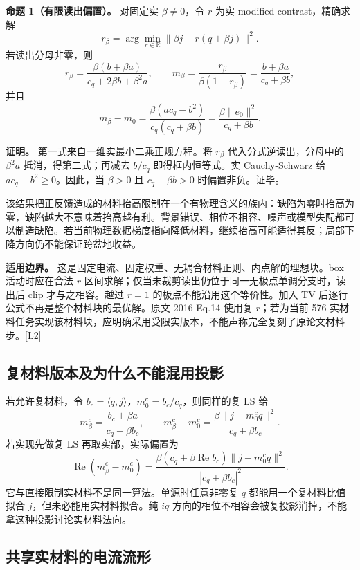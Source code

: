 \documentclass[10pt,a4paper]{article}
\begin{document}
\textbf{命题 1（有限读出偏置）。} 对固定实 \(\beta\ne0\)，令 \(r\) 为实
modified contrast，精确求解
\[r_\beta=\arg\min_{r\in\mathbb R}\|\beta j-r(q+\beta j)\|^2.\]
若读出分母非零，则
\[r_\beta=\frac{\beta(b+\beta a)}{c_q+2\beta b+\beta^2a},\qquad
m_\beta=\frac{r_\beta}{\beta(1-r_\beta)}=\frac{b+\beta a}{c_q+\beta b},\]
并且 \[\boxed{m_\beta-m_0=\frac{\beta(ac_q-b^2)}{c_q(c_q+\beta b)}
=\frac{\beta\|e_0\|^2}{c_q+\beta b}.}\]

\textbf{证明。} 第一式来自一维实最小二乘正规方程。将 \(r_\beta\)
代入分式逆读出，分母中的 \(\beta^2a\) 抵消，得第二式；再减去 \(b/c_q\)
即得框内恒等式。实 Cauchy-Schwarz 给 \(ac_q-b^2\ge0\)。因此，当
\(\beta>0\) 且 \(c_q+\beta b>0\) 时偏置非负。证毕。

该结果把正反馈造成的材料抬高限制在一个有物理含义的族内：缺陷为零时抬高为零，缺陷越大不意味着抬高越有利。背景错误、相位不相容、噪声或模型失配都可以制造缺陷。若当前物理数据梯度指向降低材料，继续抬高可能适得其反；局部下降方向仍不能保证跨盆地收益。

\textbf{适用边界。}
这是固定电流、固定权重、无耦合材料正则、内点解的理想块。box
活动时应在合法 \(r\)
区间求解；仅当未裁剪读出仍位于同一无极点单调分支时，读出后 clip
才与之相容。越过 \(r=1\) 的极点不能沿用这个等价性。加入 TV
后逐行公式不再是整个材料块的最优解。原文 2016 Eq.14 使用复
\(r\)；若为当前 576
实材料任务实现该材料块，应明确采用受限实版本，不能声称完全复刻了原论文材料步。{[}L2{]}

\hypertarget{ux590dux6750ux6599ux7248ux672cux53caux4e3aux4ec0ux4e48ux4e0dux80fdux6df7ux7528ux6295ux5f71}{%
\subsection{复材料版本及为什么不能混用投影}\label{ux590dux6750ux6599ux7248ux672cux53caux4e3aux4ec0ux4e48ux4e0dux80fdux6df7ux7528ux6295ux5f71}}

若允许复材料，令
\(b_c=\langle q,j\rangle\)，\(m_0^c=b_c/c_q\)，则同样的复 LS 给
\[m_\beta^c=\frac{b_c+\beta a}{c_q+\beta\overline{b_c}},\qquad
m_\beta^c-m_0^c=\frac{\beta\|j-m_0^cq\|^2}{c_q+\beta\overline{b_c}}.\]
若实现先做复 LS 再取实部，实际偏置为
\[\operatorname{Re}(m_\beta^c-m_0^c)=
\frac{\beta(c_q+\beta\operatorname{Re}b_c)\|j-m_0^cq\|^2}
{|c_q+\beta\overline{b_c}|^2}.\]
它与直接限制实材料不是同一算法。单源时任意非零复 \(q\)
都能用一个复材料比值拟合 \(j\)，但未必能用实材料拟合。纯 \(iq\)
方向的相位不相容会被复投影消掉，不能拿这种投影讨论实材料法向。

\hypertarget{ux5171ux4eabux5b9eux6750ux6599ux7684ux7535ux6d41ux6d41ux5f62}{%
\subsection{共享实材料的电流流形}\label{ux5171ux4eabux5b9eux6750ux6599ux7684ux7535ux6d41ux6d41ux5f62}}
\end{document}
